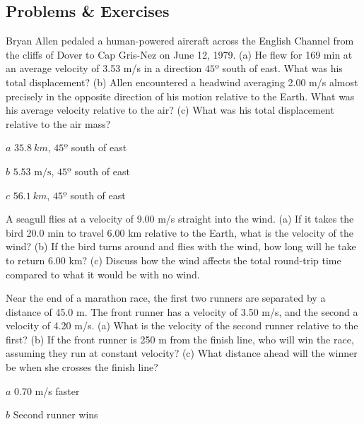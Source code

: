 \documentclass[
]{book}
\newenvironment{problems-exercises}{}{}
\begin{document}
\hypertarget{fs-id1804537}{}
\begin{problems-exercises}

\hypertarget{problems-exercises-9}{%
\subsection{Problems \& Exercises}\label{problems-exercises-9}}

\hypertarget{fs-id1533507}{}
\leavevmode\hypertarget{fs-id1533508}{}%
Bryan Allen pedaled a human-powered aircraft across the English Channel
from the cliffs of Dover to Cap Gris-Nez on June 12, 1979. (a) He flew
for 169 min at an average velocity of 3.53 m/s in a direction
\(\text{45º}{}\) south of east. What was his total displacement? (b) Allen
encountered a headwind averaging 2.00 m/s almost precisely in the
opposite direction of his motion relative to the Earth. What was his
average velocity relative to the air? (c) What was his total
displacement relative to the air mass?

\leavevmode\hypertarget{fs-id1711341}{}%
\(a\) \({\text{35}\text{.}8\ km}{}\), \(\text{45º}{}\) south of east

\(b\) \({5\text{.}\text{53\ m/s}}{}\), \(\text{45º}{}\) south of east

\(c\) \({\text{56}\text{.}1\ km}{}\), \(\text{45º}{}\) south of east

\hypertarget{eip-342}{}
\leavevmode\hypertarget{eip-949}{}%
A seagull flies at a velocity of 9.00 m/s straight into the wind. (a) If
it takes the bird 20.0 min to travel 6.00 km relative to the Earth, what
is the velocity of the wind? (b) If the bird turns around and flies with
the wind, how long will he take to return 6.00 km? (c) Discuss how the
wind affects the total round-trip time compared to what it would be with
no wind.

\hypertarget{fs-id1374901}{}
\leavevmode\hypertarget{fs-id1374902}{}%
Near the end of a marathon race, the first two runners are separated by
a distance of 45.0 m. The front runner has a velocity of 3.50 m/s, and
the second a velocity of 4.20 m/s. (a) What is the velocity of the
second runner relative to the first? (b) If the front runner is 250 m
from the finish line, who will win the race, assuming they run at
constant velocity? (c) What distance ahead will the winner be when she
crosses the finish line?

\leavevmode\hypertarget{fs-id2080060}{}%
\(a\) 0.70 m/s faster

\(b\) Second runner wins


\end{problems-exercises}
\end{document}
